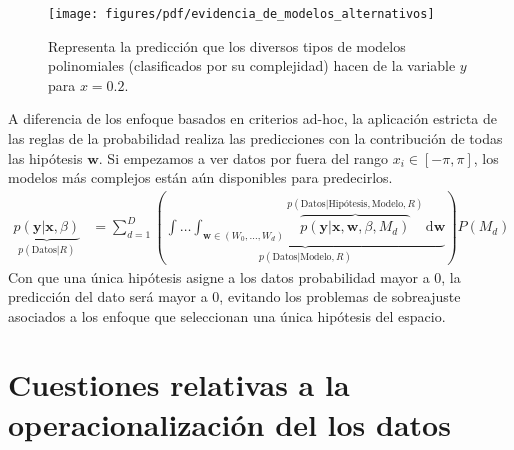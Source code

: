 \documentclass[a4paper,11pt]{book}
\theoremstyle{definition}
\begin{document}

\begin{figure}[ht!] \centering
 \texttt{[image: figures/pdf/evidencia\_de\_modelos\_alternativos]}
  \caption{Representa la predicci\'on que los diversos tipos de modelos polinomiales (clasificados por su complejidad) hacen de la variable $y$ para $x=0.2$.}
  \label{fig:balance_natural}
\end{figure}


A diferencia de los enfoque basados en criterios ad-hoc, la aplicaci\'on estricta de las reglas de la probabilidad realiza las predicciones con la contribuci\'on de todas las hip\'otesis $\bm{w}$.
%
Si empezamos a ver datos por fuera del rango $x_i \in [-\pi, \pi]$, los modelos m\'as complejos est\'an a\'un disponibles para predecirlos.
%
\begin{equation*}
\begin{split}
\underbrace{p(\bm{y}|\bm{x},\beta)}_{p(\text{Datos}|R)} & = \sum_{d=1}^D \left( \underbrace{ \int\dots\int_{\bm{w} \in (W_0, \dots, W_d)} \overbrace{p(\bm{y}|\bm{x}, \bm{w}, \beta, M_d)}^{p(\text{Datos}|\text{Hip\'otesis},\text{Modelo},R)} \, \text{d}\bm{w} }_{p(\text{Datos}|\text{Modelo},R)} \right) P(M_d)
\end{split}
\end{equation*}
%
Con que una \'unica hip\'otesis asigne a los datos probabilidad mayor a $0$, la predicci\'on del dato ser\'a mayor a $0$, evitando los problemas de sobreajuste asociados a los enfoque que seleccionan una \'unica hip\'otesis del espacio.
%


\section{Cuestiones relativas a la operacionalizaci\'on del los datos} \label{sec:base_empirica_metodo}
\end{document}
